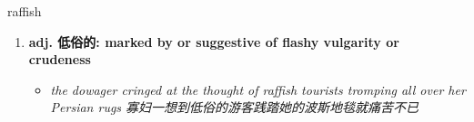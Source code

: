 
\begin{frame}
{\huge raffish}
\begin{center}
\begin{enumerate}\Large
  \item \textbf{adj. 低俗的: marked by or suggestive of flashy vulgarity or crudeness}
  \begin{itemize}
    \item \em{\Large{the dowager cringed at the thought of raffish tourists tromping all over her Persian rugs 寡妇一想到低俗的游客践踏她的波斯地毯就痛苦不已}}
  \end{itemize}
\end{enumerate}
\end{center}
\end{frame}
